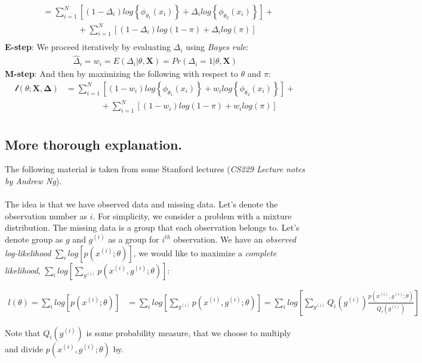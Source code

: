 \documentclass[]{article}
\begin{document}
{{$$\begin{aligned}
	&=\sum_{i=1}^N \left[{(1-\Delta_i)}log\left\{\phi_{\theta_1}(x_i)\right\} + {\Delta_i}log \left\{\phi_{\theta_2}(x_i)\right\}\right] + \\
	&~~~~~~~~~~~~~~~~~~~ +\sum_{i=1}^N \left[{(1-\Delta_i)}log(1-\pi) + {\Delta_i}log (\pi)\right]\\
\end{aligned}
$$
\textbf{E-step}: We proceed iteratively by evaluating $\Delta_i$ using \emph{Bayes rule}:
$$
\begin{aligned}
	\hat{\Delta}_i = w_i = E(\Delta_i |\theta,\pmb{X}) = Pr(\Delta_i=1 |\theta,\pmb{X})
\end{aligned}
$$
\textbf{M-step}: And then by maximizing the following with respect to $\theta$ and $\pi$:
$$
\begin{aligned}
	\mathcal{l}(\theta; \pmb{X}, \pmb{\Delta})
	&=\sum_{i=1}^N \left[{(1-w_i)}log\left\{\phi_{\theta_1}(x_i)\right\} + {w_i}log \left\{\phi_{\theta_2}(x_i)\right\}\right] + \\
	&~~~~~~~~~~~~~~~~~~~ +\sum_{i=1}^N \left[{(1-w_i)}log(1-\pi) + {w_i}log (\pi)\right]\\
\end{aligned}
$$
}} %

\subsection{More thorough explanation.}
The following material is taken from some Stanford lectures (\emph{CS229 Lecture notes by Andrew Ng}).\\
~\\
The idea is that we have observed data and missing data. Let's denote the observation number as $i$. For simplicity, we consider a problem with a mixture distribution. The missing data is a group that each observation belongs to. Let's denote group as $g$ and $g^{(i)}$ as a group for $i^{th}$ observation. We  have an \emph{observed log-likelihood} $\sum_i log[p(x^{(i)};\theta)]$, we would like to maximize a \emph{complete likelihood}, $\sum_i  log\left[\sum_{g^{(i)}} p(x^{(i)},g^{(i)};\theta)\right]$:

$$
\begin{aligned}
	{l}(\theta) = \sum_i log[p(x^{(i)};\theta)] &= \sum_i  log\left[\sum_{g^{(i)}} p(x^{(i)},g^{(i)};\theta)\right] =  \sum_i  log\left[\sum_{g^{(i)}}Q_i(g^{(i)}) \frac{p(x^{(i)},g^{(i)};\theta)}{Q_i(g^{(i)})}\right]
\end{aligned}
$$

Note that $Q_i(g^{(i)})$ is some probability measure, that we choose to multiply and divide $p(x^{(i)},g^{(i)};\theta)$ by.
\end{document}
